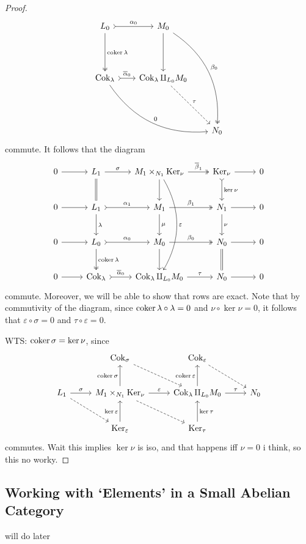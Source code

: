 \begin{proof}
\[\begin{tikzcd}[row sep = 4.5em, column sep = 2em]
		L_0\arrow[r, tail, "\alpha _0"]\arrow[d, two heads, "\coker \lambda "]&M_0\arrow[d]\arrow[ddr, bend left, two heads, "\beta _0"]\\
		\operatorname{Cok} _\lambda \arrow[r, tail, " \overline{\alpha } _0"]\arrow[drr, bend right, "0"]&\operatorname{Cok} _\lambda \amalg_{L_0} M_0\arrow[dr, dashed, "\tau "]\\
														 &&N_0
	\end{tikzcd}\]
	commute. It follows that the diagram
	\[\begin{tikzcd}[row sep = 2.5em, column sep = 2.5em]
		0\arrow[r]&L_1\arrow[d, equals]\arrow[r, "\sigma "]&M_1\times _{N_1} \operatorname{Ker} _\nu\arrow[d] \arrow[r, two heads, " \overline{\beta }_1"]\arrow[ddd, bend left, "\varepsilon "]&\operatorname{Ker} _\nu \arrow[d, tail, "\ker \nu "]\arrow[r]&0\\
		0\arrow[r]&L_1\arrow[d, "\lambda "]\arrow[r, tail, "\alpha _1"]&M_1\arrow[d, "\mu "]\arrow[r, two heads, "\beta _1"]&N_1\arrow[d, "\nu "]\arrow[r]&0\\
		0\arrow[r]&L_0\arrow[r, tail, "\alpha _0"]\arrow[d, two heads, "\coker \lambda "]&M_0\arrow[r, two heads, "\beta _0"]\arrow[d]&N_0\arrow[d, equals]\arrow[r]&0\\
		0\arrow[r]&\operatorname{Cok} _\lambda \arrow[r, tail, " \overline{\alpha } _0"]&\operatorname{Cok} _\lambda \amalg_{L_0} M_0\arrow[r, "\tau "]&N_0\arrow[r]&0
	\end{tikzcd}\]
	commute. Moreover, we will be able to show that rows are exact. Note that by commutivity of the diagram, since $\operatorname{coker} \lambda \circ \lambda =0$ and $\nu \circ \ker \nu =0$, it follows that $\varepsilon \circ \sigma =0$ and $\tau \circ \varepsilon =0$.

	WTS: $\operatorname{coker} \sigma =\ker \nu $, since
	\[\begin{tikzcd}[row sep = 2.5em, column sep = 2.5em]
		&\operatorname{Cok}_\sigma \arrow[dr, dashed]&\operatorname{Cok}_\varepsilon \arrow[dr, dashed]\\
		L_1\arrow[r, "\sigma "]\arrow[dr, dashed]&M_1\times _{N_1} \operatorname{Ker} _\nu \arrow[r, "\varepsilon "]\arrow[dr, dashed]\arrow[u, "\coker \sigma "]&\operatorname{Cok} _\lambda \amalg_{L_0} M_0\arrow[u, "\coker \varepsilon "]\arrow[r, "\tau "]&N_0\\
							 &\operatorname{Ker} _\varepsilon \arrow[u, "\ker \varepsilon "]&\operatorname{Ker}_\tau \arrow[u, "\ker \tau "']
	\end{tikzcd}\]
	commutes. Wait this implies $\ker \nu $ is iso, and that happens iff $\nu =0$ i think, so this no worky.
\end{proof}
\subsection{Working with `Elements' in a Small Abelian Category}
will do later
